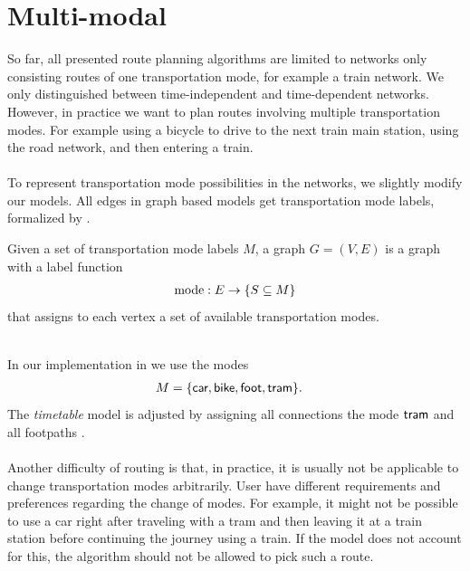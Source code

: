 \section{Multi-modal}\label{multiModal_sec}
	So far, all presented route planning algorithms are limited to networks only consisting routes of one transportation mode,
	for example a train network. We only distinguished between time-independent and time-dependent networks. However, in practice
	we want to plan routes involving multiple transportation modes. For example using a bicycle to drive to the next train main station,
	using the road network, and then entering a train.\\\\
	To represent transportation mode possibilities in the networks, we slightly modify our models. All edges in graph based models
	get transportation mode labels, formalized by .
	\begin{mydef}\label{multiModalGraph}
		Given a set of transportation mode labels $M$, a \textnormal{\multiModal graph} $G = (V, E)$ is
		a graph with a label function
		\begin{align*}
			\operatorname{mode}: E \to \{S \subseteq M\}
		\end{align*}
		that assigns to each vertex a set of available transportation modes.
	\end{mydef}\quad\\
	In our implementation in \cobweb we use the modes
	\begin{align*}
		M	&= \{\textsf{car}, \textsf{bike}, \textsf{foot}, \textsf{tram}\}.
	\end{align*}
	The \textit{timetable} model is adjusted by assigning all connections the mode $\textsf{tram}$ and
	all footpaths \foot.\\\\
	Another difficulty of \multiModal routing is that, in practice, it is usually not be applicable to change transportation modes arbitrarily.
	User have different requirements and preferences regarding the change of modes. For example, it might not be possible to
	use a car right after traveling with a tram and then leaving it at a train station before continuing the journey using a train.
	If the model does not account for this, the algorithm should not be allowed to pick such a route.\\
